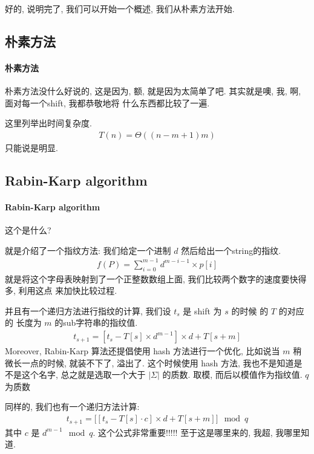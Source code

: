 \documentclass[a4paper, 10pt]{ctexart} %
\begin{document}
好的, 说明完了, 
我们可以开始一个概述, 
我们从朴素方法开始. 

\subsection{朴素方法}
\paragraph{朴素方法} %
\label{par:朴素方法}
朴素方法没什么好说的, 这是因为,
额, 就是因为太简单了吧. 其实就是噢, 我, 
啊, 面对每一个shift, 我都恭敬地将
什么东西都比较了一遍. 

这里列举出时间复杂度. 
\begin{align*}
    T(n) =  \Theta \left( ( n - m + 1 ) m \right)
\end{align*}
只能说是明显.

\subsection{Rabin-Karp algorithm}
\paragraph{Rabin-Karp algorithm} %
\label{par:Rabin-Karp algorithm}
这个是什么? 

就是介绍了一个指纹方法: 我们给定一个进制 $d$
然后给出一个string的指纹. 
\begin{align*}
    f\left( P\right) = 
    \sum_{i=0} ^{m-1}d^{m-i-1} \times p[i]
\end{align*}
就是将这个字母表映射到了一个正整数数组上面,
我们比较两个数字的速度要快得多, 利用这点
来加快比较过程. 

并且有一个递归方法进行指纹的计算, 我们设 $t_{s}$ 是 shift 为 $s$ 的时候
的 $T$ 的对应的 长度为 $m$ 的sub字符串的指纹值.
\begin{align*}
t_{s + 1} =\left[ t _{s} - T[s]\times d^{m-1} \right] \times d + T[s+m]
\end{align*}
Moreover, Rabin-Karp 算法还提倡使用 hash 方法进行一个优化, 
比如说当 $m$ 稍微长一点的时候, 就装不下了, 溢出了. 这个时候使用
hash 方法, 我也不是知道是不是这个名字, 
总之就是选取一个大于 $\left| \Sigma \right| $ 的质数. 
取模, 而后以模值作为指纹值. $q $ 为质数

同样的, 我们也有一个递归方法计算:
\begin{align*}
t _{s + 1} = \Big[\left[ t_{s} - T[s] \cdot c \right] \times d + T[s+m]  \Big]\mod q
\end{align*}
其中 $c$ 是 $d ^{m-1} \mod q$.  
这个公式非常重要!!!!! 至于这是哪里来的, 我超, 我哪里知道.
\end{document}
